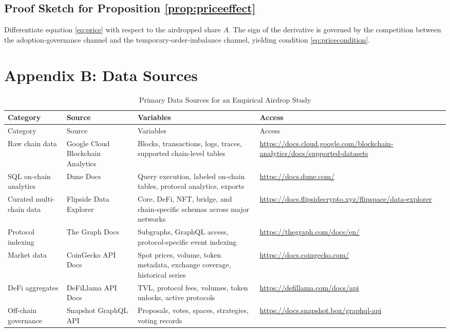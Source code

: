 \documentclass[11pt]{article}
\theoremstyle{remark}
\begin{document}
\subsection{Proof Sketch for Proposition \ref{prop:priceeffect}}

Differentiate equation \eqref{eq:price} with respect to the airdropped share $A$. The sign of the derivative is governed by the competition between the adoption-governance channel and the temporary-order-imbalance channel, yielding condition \eqref{eq:pricecondition}.

\section{Appendix B: Data Sources}

\begin{longtable}{p{}p{}p{}p{}}
\caption{Primary Data Sources for an Empirical Airdrop Study}
\label{tab:datasources} \\
\toprule
Category & Source & Variables & Access \\
\midrule
\endfirsthead
\toprule
Category & Source & Variables & Access \\
\midrule
\endhead
Raw chain data & Google Cloud Blockchain Analytics & Blocks, transactions, logs, traces, supported chain-level tables & \url{https://docs.cloud.google.com/blockchain-analytics/docs/supported-datasets} \\
SQL on-chain analytics & Dune Docs & Query execution, labeled on-chain tables, protocol analytics, exports & \url{https://docs.dune.com/} \\
Curated multi-chain data & Flipside Data Explorer & Core, DeFi, NFT, bridge, and chain-specific schemas across major networks & \url{https://docs.flipsidecrypto.xyz/flipspace/data-explorer} \\
Protocol indexing & The Graph Docs & Subgraphs, GraphQL access, protocol-specific event indexing & \url{https://thegraph.com/docs/en/} \\
Market data & CoinGecko API Docs & Spot prices, volume, token metadata, exchange coverage, historical series & \url{https://docs.coingecko.com/} \\
DeFi aggregates & DeFiLlama API Docs & TVL, protocol fees, volumes, token unlocks, active protocols & \url{https://defillama.com/docs/api} \\
Off-chain governance & Snapshot GraphQL API & Proposals, votes, spaces, strategies, voting records & \url{https://docs.snapshot.box/graphql-api} \\

\end{longtable}
\end{document}
